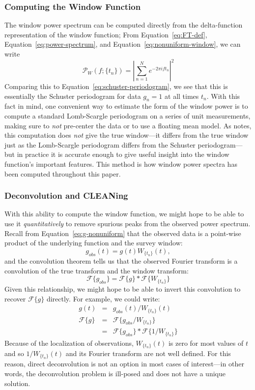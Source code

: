 \documentclass[preprint]{aastex}
\newcommand{\Eq}[1]{Equation~\ref{eq:#1}}
\newcommand{\eq}[1]{\Eq{#1}}
\newcommand{\eqlabel}[1]{\label{eq:#1}}
\begin{document}
\subsubsection{Computing the Window Function}
The window power spectrum can be computed directly from the
delta-function representation of the window function;
From \eq{FT-def}, \eq{power-spectrum}, and \eq{nonuniform-window},
we can write
\begin{equation}
  \mathcal{P}_W(f;\{t_n\}) = \left|\sum_{n=1}^{N} e^{-2\pi i f t_n}\right|^2
  \eqlabel{window-power-analytic}
\end{equation}
Comparing this to \eq{schuster-periodogram}, we see that this is essentially
the Schuster periodogram for data $g_n=1$ at all times $t_n$.
With this fact in mind, one convenient way to estimate the form of the
window power is to compute a standard Lomb-Scargle periodogram on a series of
unit measurements, making sure to {\it not} pre-center the data or to use a
floating mean model.
As \citet{Scargle82} notes, this computation does {\it not} give the true
window---it differs
from the true window just as the Lomb-Scargle periodogram differs from the
Schuster periodogram---but in practice it is accurate enough to give
useful insight into the window function's important features.
This method is how window power spectra has been computed throughout this
paper.

\subsubsection{Deconvolution and CLEANing}
With this ability to compute the window function, we might hope to be able to
use it {\it quantitatively} to remove spurious peaks from the observed
power spectrum.
Recall from \eq{g-nonuniform} that the observed data is a point-wise product
of the underlying function and the survey window:
\begin{equation}
  g_{obs}(t) = g(t)W_{\{t_n\}}(t),
\end{equation}
and the convolution theorem tells us that the observed Fourier transform is
a convolution of the true transform and the window transform:
\begin{equation}
  \mathcal{F}\{g_{obs}\} = \mathcal{F}\{g\} \ast \mathcal{F}\{W_{\{t_n\}}\}
\end{equation}
Given this relationship, we might hope to be able to invert this
convolution to recover $\mathcal{F}\{g\}$ directly.
For example, we could write:
\begin{eqnarray}
  g(t) &=& g_{obs}(t) / W_{\{t_n\}}(t)\nonumber\\
  \mathcal{F}\{g\} &=& \mathcal{F}\{g_{obs}/W_{\{t_n\}}\}\nonumber\\
                   &=& \mathcal{F}\{g_{obs}\} \ast \mathcal{F}\{1/W_{\{t_n\}}\}
\end{eqnarray}
Because of the localization of observations, $W_{\{t_n\}}(t)$ is zero for most
values of $t$ and so $1/W_{\{t_n\}}(t)$ and its Fourier transform are not well
defined. For this reason, direct deconvolution is not an option in most
cases of interest---in other words, the deconvolution problem is ill-posed
and does not have a unique solution.
\end{document}
